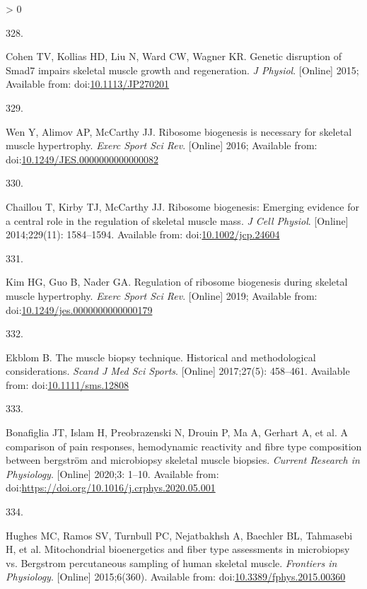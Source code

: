 \documentclass[twoside,10pt]{gihclass} %
\newlength{\cslhangindent}
\newlength{\csllabelwidth}
\newenvironment{CSLReferences}[3] %
 {%
  \setlength{\parindent}{0pt}
  \ifodd #1 \everypar{\setlength{\hangindent}{\cslhangindent}}\ignorespaces\fi
  \ifnum #2 > 0
  \setlength{\parskip}{#2\baselineskip}
  \fi
 }%
 {}
\newcommand{\CSLLeftMargin}[1]{\parbox[t]{\maxof{\widthof{#1}}{\csllabelwidth}}{#1}}
\newcommand{\CSLRightInline}[1]{\parbox[t]{\linewidth}{#1}}
\begin{document}
\begin{CSLReferences}{0}{0}
\leavevmode\hypertarget{ref-RN1619}{}%
\CSLLeftMargin{328. }
\CSLRightInline{Cohen TV, Kollias HD, Liu N, Ward CW, Wagner KR. Genetic disruption of Smad7 impairs skeletal muscle growth and regeneration. \emph{J Physiol}. {[}Online{]} 2015; Available from: doi:\href{https://doi.org/10.1113/JP270201}{10.1113/JP270201}}

\leavevmode\hypertarget{ref-RN1757}{}%
\CSLLeftMargin{329. }
\CSLRightInline{Wen Y, Alimov AP, McCarthy JJ. Ribosome biogenesis is necessary for skeletal muscle hypertrophy. \emph{Exerc Sport Sci Rev}. {[}Online{]} 2016; Available from: doi:\href{https://doi.org/10.1249/JES.0000000000000082}{10.1249/JES.0000000000000082}}

\leavevmode\hypertarget{ref-RN1654}{}%
\CSLLeftMargin{330. }
\CSLRightInline{Chaillou T, Kirby TJ, McCarthy JJ. Ribosome biogenesis: Emerging evidence for a central role in the regulation of skeletal muscle mass. \emph{J Cell Physiol}. {[}Online{]} 2014;229(11): 1584--1594. Available from: doi:\href{https://doi.org/10.1002/jcp.24604}{10.1002/jcp.24604}}

\leavevmode\hypertarget{ref-RN2150}{}%
\CSLLeftMargin{331. }
\CSLRightInline{Kim HG, Guo B, Nader GA. Regulation of ribosome biogenesis during skeletal muscle hypertrophy. \emph{Exerc Sport Sci Rev}. {[}Online{]} 2019; Available from: doi:\href{https://doi.org/10.1249/jes.0000000000000179}{10.1249/jes.0000000000000179}}

\leavevmode\hypertarget{ref-RN2549}{}%
\CSLLeftMargin{332. }
\CSLRightInline{Ekblom B. The muscle biopsy technique. Historical and methodological considerations. \emph{Scand J Med Sci Sports}. {[}Online{]} 2017;27(5): 458--461. Available from: doi:\href{https://doi.org/10.1111/sms.12808}{10.1111/sms.12808}}

\leavevmode\hypertarget{ref-RN2553}{}%
\CSLLeftMargin{333. }
\CSLRightInline{Bonafiglia JT, Islam H, Preobrazenski N, Drouin P, Ma A, Gerhart A, et al. A comparison of pain responses, hemodynamic reactivity and fibre type composition between bergström and microbiopsy skeletal muscle biopsies. \emph{Current Research in Physiology}. {[}Online{]} 2020;3: 1--10. Available from: doi:\url{https://doi.org/10.1016/j.crphys.2020.05.001}}

\leavevmode\hypertarget{ref-RN2552}{}%
\CSLLeftMargin{334. }
\CSLRightInline{Hughes MC, Ramos SV, Turnbull PC, Nejatbakhsh A, Baechler BL, Tahmasebi H, et al. Mitochondrial bioenergetics and fiber type assessments in microbiopsy vs. Bergstrom percutaneous sampling of human skeletal muscle. \emph{Frontiers in Physiology}. {[}Online{]} 2015;6(360). Available from: doi:\href{https://doi.org/10.3389/fphys.2015.00360}{10.3389/fphys.2015.00360}}


\end{CSLReferences}
\end{document}
